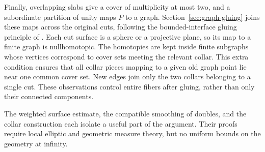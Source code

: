 Finally, overlapping slabs give a cover of multiplicity at most two,
and a subordinate partition of unity maps $P$ to a graph.
Section~\ref{sec:graph-gluing} joins these maps across the original
cuts, following the bounded-interface gluing principle of
\cite[Section~3.10.1, Lemma~(A)]{GromovFourLectures2023}.
Each cut surface is a sphere or a projective plane, so its map
to a finite graph is nullhomotopic. The homotopies are kept inside
finite subgraphs whose vertices correspond to cover sets meeting
the relevant collar. This extra condition ensures that all collar
pieces mapping to a given old graph point lie near one common cover
set. New edges join only the two collars belonging to a single cut.
These observations control entire fibers after gluing, rather than
only their connected components.

The weighted surface estimate, the compatible smoothing of doubles,
and the collar construction each isolate a useful part of the
argument. Their proofs require local elliptic and geometric measure
theory, but no uniform bounds on the geometry at infinity.
